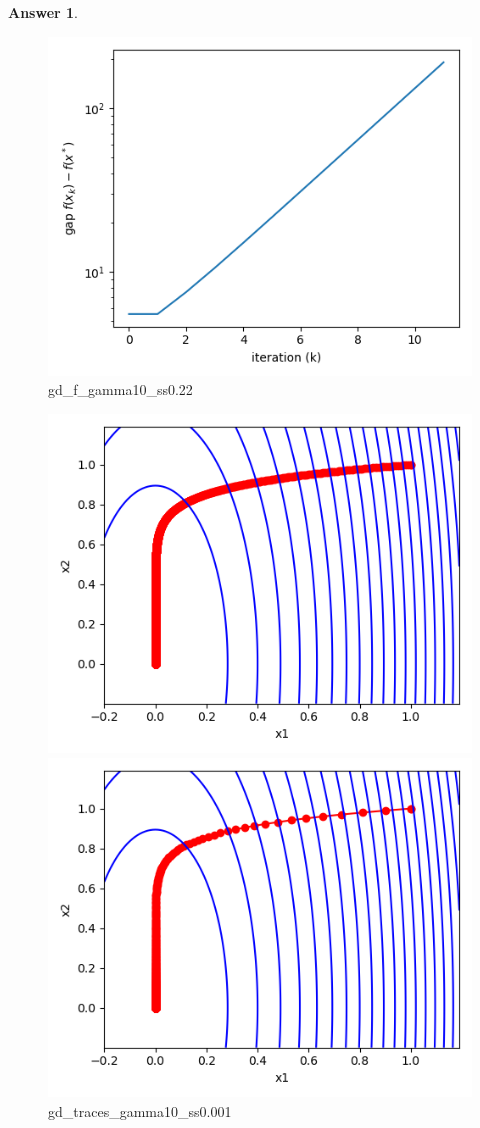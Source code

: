 \documentclass{article}
\theoremstyle{definition}
\newtheorem{ans}{Answer}
\begin{document}
\begin{ans}
\begin{enumerate}[(a)]
\begin{figure}
\begin{minipage}[t]{0.48\textwidth}
					\caption{gd\_f\_gamma10\_ss0.1}
				\end{minipage}
				\begin{minipage}[t]{0.48\textwidth}
					\centering
					\includegraphics[width=0.7\linewidth]{../figures/gd_f_gamma10_ss0.22}
					\caption{gd\_f\_gamma10\_ss0.22}
				\end{minipage}
			\end{figure}
			\begin{figure}
				\begin{minipage}[t]{0.48\textwidth}
					\centering
					\includegraphics[width=0.7\linewidth]{../figures/gd_traces_gamma10_ss0.001}
					\caption{gd\_traces\_gamma10\_ss0.001}
				\end{minipage}
				\begin{minipage}[t]{0.48\textwidth}
					\centering
					\includegraphics[width=0.7\linewidth]{../figures/gd_traces_gamma10_ss0.01}

\end{minipage}
\end{figure}
\end{enumerate}
\end{ans}
\end{document}
